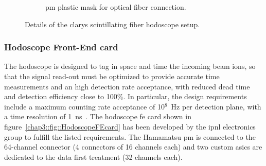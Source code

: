 \begin{figure}
\begin{subfigure}[t]{.5\textwidth}
\caption{\gls{pm} plastic mask for optical fiber connection.}
\label{chap3::fig::PMmask}
\end{subfigure}
\caption{Details of the \gls{clarys} scintillating fiber hodoscope setup.}
\label{chap3::fig::HodoscopeParts}
\end{figure}


\subsubsection{Hodoscope Front-End card}\label{chap3::subsubsec::HodoFEcard}

The hodoscope is designed to tag in space and time the incoming beam ions, so that the signal read-out must be optimized to provide accurate time measurements and an high detection rate acceptance, with reduced dead time and detection efficiency close to 100\%. In particular, the design requirements include a maximum counting rate acceptance of 10$^{8}$~Hz per detection plane, with a time resolution of 1~ns~\parencite{Krimmer2014}.  The hodoscope \gls{fe} card shown in figure~\ref{chap3::fig::HodoscopeFEcard} has been developed by the \gls{ipnl} electronics group to fulfill the listed requirements. The Hamamatsu \gls{pm} is connected to the 64-channel connector (4 connectors of 16 channels each) and two custom \glspl{asic} are dedicated to the data first treatment (32 channels each).\\
  
